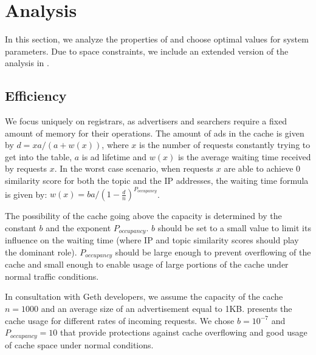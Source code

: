 
\section{Analysis}\label{sec:analysis}
In this section, we analyze the properties of \sysname and choose optimal values for system parameters. Due to space constraints, we include an extended version of the analysis in .
\subsection{Efficiency}

We focus uniquely on registrars, as advertisers and searchers require a fixed amount of memory for their operations. The amount of ads in the cache is given by $d = xa/(a + w(x))$, where $x$ is the number of requests constantly trying to get into the table, $a$ is ad lifetime and $w(x)$ is the average waiting time received by requests $x$.
In the worst case scenario, when requests $x$ are able to achieve 0 similarity score for both the topic and the IP addresses, the waiting time formula is given by: $w(x) = ba/(1 - \frac{d}{n})^{P_\textit{occupancy}}$.

The possibility of the cache going above the capacity is determined by the constant $b$ and the exponent $P_\textit{occupancy}$. $b$ should be set to a small value to limit its influence on the waiting time (where IP and topic similarity scores should play the dominant role). $P_\textit{occupancy}$ should be large enough to prevent overflowing of the cache and small enough to enable usage of large portions of the cache under normal traffic conditions. 

In consultation with Geth developers, we assume the capacity of the cache $n = 1000$ and an average size of an advertisement equal to 1KB.  presents the cache usage for different rates of incoming requests. We chose $b=10^{-7}$ and $P_\textit{occupancy}=10$ that provide protections against cache overflowing and good usage of cache space under normal conditions. 

